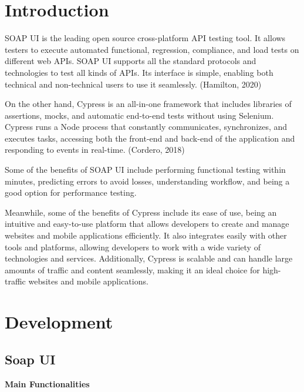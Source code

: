 \documentclass{article}
\begin{document}
	
	
	
	
	\section*{Introduction}
SOAP UI is the leading open source cross-platform API testing tool. It allows testers to execute automated functional, regression, compliance, and load tests on different web APIs. SOAP UI supports all the standard protocols and technologies to test all kinds of APIs. Its interface is simple, enabling both technical and non-technical users to use it seamlessly. (Hamilton, 2020)

On the other hand, Cypress is an all-in-one framework that includes libraries of assertions, mocks, and automatic end-to-end tests without using Selenium. Cypress runs a Node process that constantly communicates, synchronizes, and executes tasks, accessing both the front-end and back-end of the application and responding to events in real-time. (Cordero, 2018)

Some of the benefits of SOAP UI include performing functional testing within minutes, predicting errors to avoid losses, understanding workflow, and being a good option for performance testing.

Meanwhile, some of the benefits of Cypress include its ease of use, being an intuitive and easy-to-use platform that allows developers to create and manage websites and mobile applications efficiently. It also integrates easily with other tools and platforms, allowing developers to work with a wide variety of technologies and services. Additionally, Cypress is scalable and can handle large amounts of traffic and content seamlessly, making it an ideal choice for high-traffic websites and mobile applications.
	
	\section{Development}
	
	\subsection{Soap UI}
	
	\textbf{Main Functionalities}
	
\end{document}
